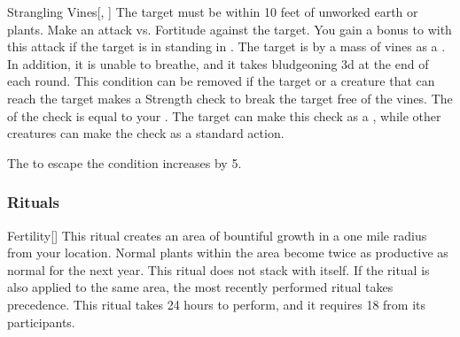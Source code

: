 \lowercase{\hypertarget{spell:Strangling Vines}{}}\label{spell:Strangling Vines}
\begin{freeability}[Rank 6]{\hypertarget{spell:Strangling Vines}{Strangling Vines}}[, ]
The target must be within 10 feet of unworked earth or plants.
Make an attack vs. Fortitude against the target.
You gain a  bonus to  with this attack if the target is in standing in .
\hit The target is  by a mass of vines as a .
In addition, it is unable to breathe, and it takes bludgeoning  \minus3d at the end of each round.
This condition can be removed if the target or a creature that can reach the target makes a Strength check to break the target free of the vines.
The  of the check is equal to your .
The target can make this check as a , while other creatures can make the check as a standard action.

\rankline
{} The  to escape the condition increases by 5.

\end{freeability}
\vspace{0.25em}



\subsubsection{Rituals}


\lowercase{\hypertarget{spell:Fertility}{}}\label{spell:Fertility}
\begin{freeability}[Rank 3]{\hypertarget{spell:Fertility}{Fertility}}[]
\targetrule
This ritual creates an area of bountiful growth in a one mile radius  from your location.
Normal plants within the area become twice as productive as normal for the next year.
This ritual does not stack with itself.
If the  ritual is also applied to the same area, the most recently performed ritual takes precedence.
This ritual takes 24 hours to perform, and it requires 18  from its participants.
\end{freeability}
\vspace{0.25em}



